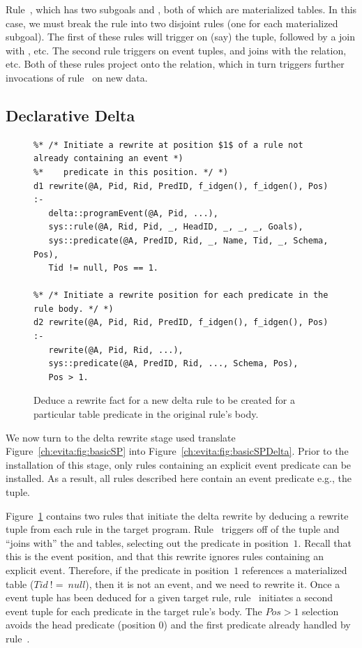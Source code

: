 Rule~, which has two subgoals  and , both of which are
materialized tables.  In this case, we must break the rule into two disjoint
rules (one for each materialized subgoal).  The first of these rules will
trigger on (say) the  tuple, followed by a join with , etc.
The second rule triggers on  event tuples, and joins with the
 relation, etc.  Both of these rules project onto the 
relation, which in turn triggers further invocations of rule~ on new
 data.

\subsection{Declarative Delta}

\begin{figure}[!t]
\ssp
\centering
\begin{lstlisting}
%* /* Initiate a rewrite at position $1$ of a rule not already containing an event *)
%*    predicate in this position. */ *)
d1 rewrite(@A, Pid, Rid, PredID, f_idgen(), f_idgen(), Pos) :-
   delta::programEvent(@A, Pid, ...), 
   sys::rule(@A, Rid, Pid, _, HeadID, _, _, _, Goals),
   sys::predicate(@A, PredID, Rid, _, Name, Tid, _, Schema, Pos),
   Tid != null, Pos == 1.

%* /* Initiate a rewrite position for each predicate in the rule body. */ *)
d2 rewrite(@A, Pid, Rid, PredID, f_idgen(), f_idgen(), Pos) :-
   rewrite(@A, Pid, Rid, ...),
   sys::predicate(@A, PredID, Rid, ..., Schema, Pos),
   Pos > 1.
\end{lstlisting}
\caption{\label{ch:evita:fig:delta1}Deduce a rewrite fact for a new delta rule to be
created for a particular table predicate in the original rule's body.}
\end{figure}

We now turn to the delta rewrite \OVERLOG stage used translate
Figure~\ref{ch:evita:fig:basicSP} into Figure~\ref{ch:evita:fig:basicSPDelta}.
Prior to the installation of this stage, only rules containing an explicit
event predicate can be installed.  As a result, all rules described here
contain an event predicate e.g., the  tuple.

Figure~\ref{ch:evita:fig:delta1} contains two rules that initiate the delta
rewrite by deducing a rewrite tuple from each rule in the target program.
Rule~ triggers off of the  tuple and ``joins
with'' the  and  tables, selecting out the predicate in
position~$1$.  Recall that this is the event position, and that this rewrite
ignores rules containing an explicit event.  Therefore, if the predicate in
position~$1$ references a materialized table ($Tid\ !=\ null$), then it is not
an event, and we need to rewrite it.  Once a  event tuple has been
deduced for a given target rule, rule~ initiates a second 
event tuple for each predicate in the target rule's body.  The $Pos > 1$
selection avoids the head predicate (position $0$) and the first predicate
already handled by rule~.

